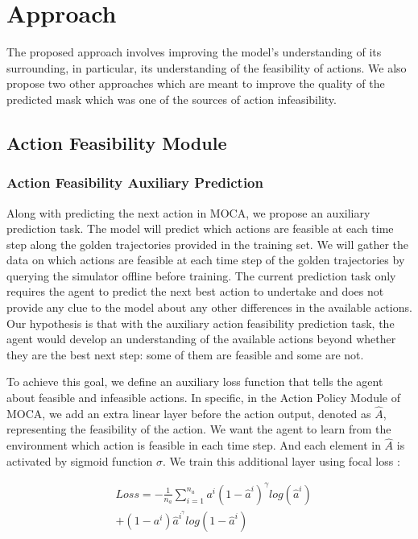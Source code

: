 \documentclass[11pt,a4paper]{article}
\begin{document}
\section{Approach}
The proposed approach involves improving the model's understanding of its surrounding, in particular, its understanding of the feasibility of actions. We also propose two other approaches which are meant to improve the quality of the predicted mask which was one of the sources of action infeasibility.

\subsection{Action Feasibility Module}


\subsubsection{Action Feasibility Auxiliary Prediction}
Along with predicting the next action in MOCA, we propose an auxiliary prediction task. The model will predict which actions are feasible at each time step along the golden trajectories provided in the training set. 
We will gather the data on which actions are feasible at each time step of the golden trajectories by querying the simulator offline before training. 
The current prediction task only requires the agent to predict the next best action to undertake  and does not provide any clue to the model about any other differences in the available actions. Our hypothesis is that with the auxiliary action feasibility prediction task, the agent would develop an understanding of the available actions beyond whether they are the best next step: some of them are feasible and some are not.

To achieve this goal, we define an auxiliary loss function that tells the agent about feasible and infeasible actions. In specific, in the Action Policy Module of MOCA, we add an extra linear layer before the action output, denoted as $\hat{A}$, representing the feasibility of the action. We want the agent to learn from the environment which action is feasible in each time step. And each element in $\hat{A}$ is activated by sigmoid function $\sigma$. We train this additional layer using focal loss \cite{lin2017focal}:

\begin{equation}
\begin{split}
    & Loss = -\frac{1}{n_a} \sum_{i=1}^{n_a} a^{i} (1 - \hat{a}^{i})^{\gamma} log (\hat{a}^{i}) \\
    & + (1 - a^{i}) \hat{a}^{i}^{\gamma} log (1 - \hat{a}^{i})
\end{split}
\end{equation}
\end{document}
